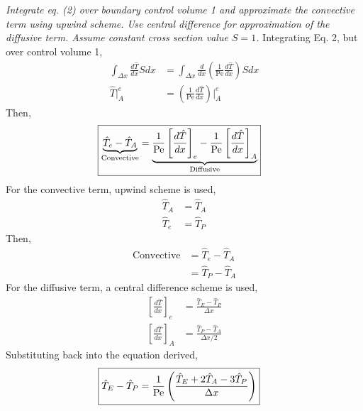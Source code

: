 \section{}
\textit{Integrate eq. (2) over boundary control volume 1 and approximate the convective term using upwind scheme. Use central difference for approximation of the diffusive term. Assume constant cross section value $S = 1$.}
Integrating Eq. 2, but over control volume 1,
\begin{align*}
    \int_{\Delta x} \frac{d \hat{T}}{dx} S dx &= \int_{\Delta x} \frac{d}{dx}\left(\frac{1}{\text{Pe}} \frac{d \hat{T}}{dx}\right) S dx \\
    \hat{T} \bigg|_{A}^{e} &= \left(\frac{1}{\text{Pe}} \frac{d \hat{T}}{dx}\right) \bigg|_{A}^{e}
\end{align*}
Then,
\begin{align*}
    \Aboxed{\underbrace{\hat{T}_e - \hat{T}_A}_{\text{Convective}} &= \underbrace{\frac{1}{\text{Pe}} \left[\frac{d \hat{T}}{dx}\right]_e - \frac{1}{\text{Pe}} \left[\frac{d \hat{T}}{dx}\right]_A}_{\text{Diffusive}}}
\end{align*}
For the convective term, upwind scheme is used,
\begin{align*}
    \hat{T}_A &= \hat{T}_A \\
    \hat{T}_e &= \hat{T}_P
\end{align*}
Then,
\begin{align*}
    \text{Convective} &= \hat{T}_e - \hat{T}_A \\
    &= \hat{T}_P - \hat{T}_A
\end{align*}
For the diffusive term, a central difference scheme is used,
\begin{align*}
    \left[\frac{d \hat{T}}{dx}\right]_e &= \frac{\hat{T}_E - \hat{T}_P}{\Delta x} \\
    \left[\frac{d \hat{T}}{dx}\right]_A &= \frac{\hat{T}_P - \hat{T}_A}{\Delta x/2}
\end{align*}
Substituting back into the equation derived,
\begin{align*}
    \Aboxed{\hat{T}_E - \hat{T}_P &= \frac{1}{\text{Pe}} \left(\frac{\hat{T}_E + 2 \hat{T}_A - 3 \hat{T}_P}{\Delta x}\right)} 
\end{align*}